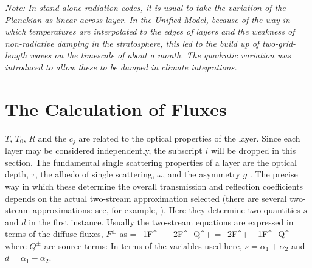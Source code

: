 {\it Note: In stand-alone radiation codes, it is usual to take the
variation of the Planckian as linear across layer. In the Unified Model,
because of the way in which temperatures are interpolated to the
edges of layers and the weakness of non-radiative damping in the
stratosphere, this led to the build up of two-grid-length waves
on the timescale of about a month. The quadratic variation was introduced
to allow these to be damped in climate integrations.}


\section{The Calculation of Fluxes}

$T$, $T_{0}$, $R$ and the  $c_{j}$ are related to the optical 
properties of the layer. Since each layer may be 
considered independently, the subscript $i$ will be dropped  in this 
section. The fundamental single scattering properties 
of a layer are the optical depth, $\tau$, the albedo of single 
scattering, $\omega$, and the asymmetry $g$ . The 
precise way in which these determine the overall transmission and 
reflection coefficients depends on the actual 
two-stream approximation selected (there are several two-stream 
approximations: see, for example, \cite{Zdunkowski80ts}).
Here they determine two quantities $s$  and $d$ in the 
first instance. Usually the two-stream 
equations are expressed in terms of the diffuse fluxes, $F^{\pm}$ as
\beq
{}=\alpha_{1}F^{+}-\alpha_{2}F^{-}-Q^{+}
\label{p2_eq10}
\eeq
\beq
{}=\alpha_{2}F^{+}-\alpha_{1}F^{-}-Q^{-}
\label{p2_eq11}
\eeq
where $Q^{\pm}$ are source terms: In terms of the variables used here, 
$s=\alpha_{1}+\alpha_{2}$ and $d=\alpha_{1}-\alpha_{2}$.\\ 

